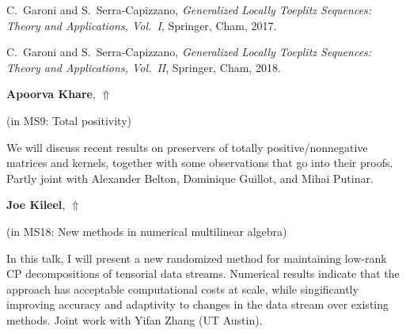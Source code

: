 \documentclass[ILAS2025-program.tex]{subfiles}
\begin{document}
\begin{ilasabstract}
\begin{bibunit}
\begin{thebibliography}{99}
C.~Garoni and S.~Serra-Capizzano,
\textit{Generalized Locally Toeplitz Sequences: Theory and Applications, Vol.~I},
Springer, Cham, 2017.

C.~Garoni and S.~Serra-Capizzano,
\textit{Generalized Locally Toeplitz Sequences: Theory and Applications, Vol.~II},
Springer, Cham, 2018.


\end{thebibliography}
        \end{bibunit}
        
\end{ilasabstract}
    

\hypertarget{down0011}{}\begin{ilasabstract}
    
\textbf{Apoorva Khare},  \hfill \hyperlink{up0011}{$\Uparrow$}
    
    
(in {\color{mstitle}MS9: Total positivity})
        
\mtskip
    We will discuss recent results on preservers of totally
positive/nonnegative matrices and kernels, together with some
observations that go into their proofs. Partly joint with Alexander
Belton, Dominique Guillot, and Mihai Putinar. 

\end{ilasabstract}
    

\hypertarget{down0189}{}\begin{ilasabstract}
    
\textbf{Joe Kileel},  \hfill \hyperlink{up0189}{$\Uparrow$}
    
    
(in {\color{mstitle}MS18: New methods in numerical multilinear algebra})
        
\mtskip
    In this talk, I will present a new randomized method for maintaining
low-rank CP decompositions of tensorial data streams.  Numerical
results indicate that the approach has acceptable computational costs
at scale, while singificantly improving accuracy and adaptivity to changes in the data stream over existing methods.  Joint work with Yifan Zhang (UT Austin).  

\end{ilasabstract}
    
\end{document}
